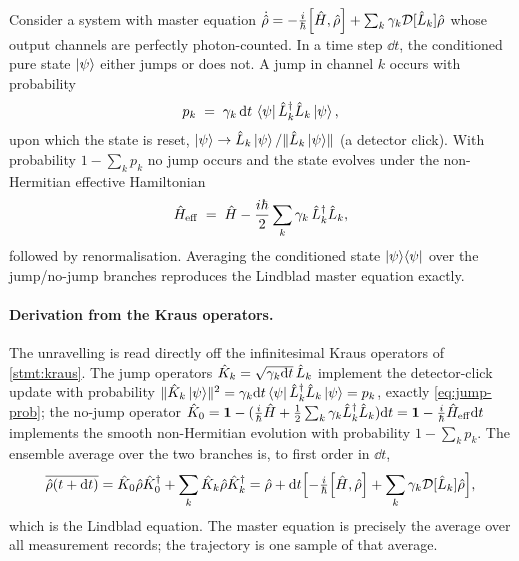 \begin{statement}
\label{stmt:quantum-jumps}
Consider a system with master equation
$\dot{\op\rho}=-\tfrac{i}{\hbar}\comm{\op H}{\op\rho}+\sum_k\gamma_k\mathcal D[\op L_k]\op\rho$
whose output channels are perfectly photon-counted. In a time step
$\dd t$, the conditioned pure state $\ket{\psi}$ either jumps or
does not. A jump in channel $k$ occurs with probability
\begin{equation}
\label{eq:jump-prob}
p_k \;=\; \gamma_k\,\dd t\,\bra{\psi}\hat{L}_k^\dagger\hat{L}_k\ket{\psi},
\end{equation}
upon which the state is reset,
$\ket{\psi}\to\hat{L}_k\ket{\psi}/\lVert\hat{L}_k\ket{\psi}\rVert$ (a
detector click). With probability $1-\sum_k p_k$ no jump occurs and
the state evolves under the non-Hermitian effective Hamiltonian
\begin{equation}
\label{eq:effective-H}
\hat{H}_{\rm eff} \;=\; \hat{H} - \frac{i\hbar}{2}\sum_k\gamma_k\,\hat{L}_k^\dagger\hat{L}_k,
\end{equation}
followed by renormalisation. Averaging the conditioned state
$\ket{\psi}\!\bra{\psi}$ over the jump/no-jump branches reproduces
the Lindblad master equation exactly.
\end{statement}

\paragraph{Derivation from the Kraus operators.}
The unravelling is read directly off the infinitesimal Kraus
operators of \cref{stmt:kraus}. The jump operators
$\hat{K}_k=\sqrt{\gamma_k\dd t}\,\hat{L}_k$ implement the
detector-click update with probability
$\lVert\hat{K}_k\ket\psi\rVert^2=\gamma_k\dd t\bra\psi\hat{L}_k^\dagger\hat{L}_k\ket\psi=p_k$,
exactly \cref{eq:jump-prob}; the no-jump operator
$\hat{K}_0=\mathbf{1}-(\tfrac{i}{\hbar}\hat{H}+\tfrac12\sum_k\gamma_k\hat{L}_k^\dagger\hat{L}_k)\dd t
=\mathbf{1}-\tfrac{i}{\hbar}\hat{H}_{\rm eff}\dd t$ implements the smooth
non-Hermitian evolution with probability $1-\sum_k p_k$. The
ensemble average over the two branches is, to first order in
$\dd t$,
\begin{equation}
\label{eq:trajectory-average}
\overline{\op\rho(t+\dd t)}
= \op K_0\op\rho\op K_0^\dagger + \sum_k\op K_k\op\rho\op K_k^\dagger
= \op\rho + \dd t\Bigl[-\tfrac{i}{\hbar}\comm{\op H}{\op\rho}+\sum_k\gamma_k\mathcal D[\op L_k]\op\rho\Bigr],
\end{equation}
which is the Lindblad equation. The master equation is precisely
the average over all measurement records; the trajectory is one
sample of that average.

